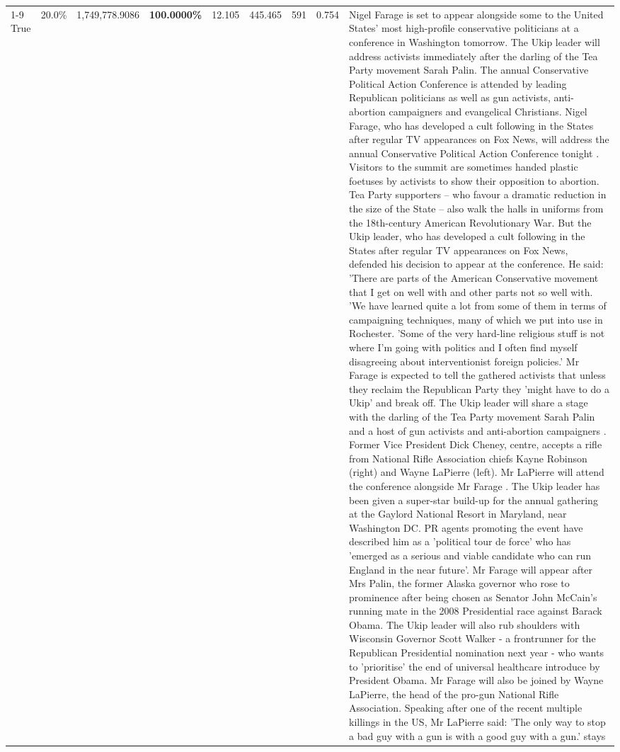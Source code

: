 \begin{table}[H]
\begin{tabular}{lllrlllll}
\cline{1-9}
True & 20.0\% & 1,749,778.9086 & \bfseries \color{red} 100.0000\% & 12.105 & 445.465 & 591 & 0.754 & Nigel Farage is set to appear alongside some to the United States' most high-profile conservative politicians at a conference in Washington tomorrow. The Ukip leader will address activists immediately after the darling of the Tea Party movement Sarah Palin. The annual Conservative Political Action Conference is attended by leading Republican politicians as well as gun activists, anti-abortion campaigners and evangelical Christians. Nigel Farage, who has developed a cult following in the States after regular TV appearances on Fox News, will address the annual Conservative Political Action Conference tonight . Visitors to the summit are sometimes handed plastic foetuses by activists to show their opposition to abortion. Tea Party supporters – who favour a dramatic reduction in the size of the State – also walk the halls in uniforms from the 18th-century American Revolutionary War. But the Ukip leader, who has developed a cult following in the States after regular TV appearances on Fox News, defended his decision to appear at the conference. He said: 'There are parts of the American Conservative movement that I get on well with and other parts not so well with. 'We have learned quite a lot from some of them in terms of campaigning techniques, many of which we put into use in Rochester. 'Some of the very hard-line religious stuff is not where I'm going with politics and I often find myself disagreeing about interventionist foreign policies.' Mr Farage is expected to tell the gathered activists that unless they reclaim the Republican Party they 'might have to do a Ukip' and break off. The Ukip leader will share a stage with the darling of the Tea Party movement Sarah Palin and a host of gun activists and anti-abortion campaigners . Former Vice President Dick Cheney, centre, accepts a rifle from National Rifle Association chiefs Kayne Robinson (right) and Wayne LaPierre (left). Mr LaPierre will attend the conference alongside Mr Farage . The Ukip leader has been given a super-star build-up for the annual gathering at the Gaylord National Resort in Maryland, near Washington DC. PR agents promoting the event have described him as a 'political tour de force' who has 'emerged as a serious and viable candidate who can run England in the near future'. Mr Farage will appear after Mrs Palin, the former Alaska governor who rose to prominence after being chosen as Senator John McCain's running mate in the 2008 Presidential race against Barack Obama. The Ukip leader will also rub shoulders with Wisconsin Governor Scott Walker - a frontrunner for the Republican Presidential nomination next year - who wants to 'prioritise' the end of universal healthcare introduce by President Obama. Mr Farage will also be joined by Wayne LaPierre, the head of the pro-gun National Rifle Association. Speaking after one of the recent multiple killings in the US, Mr LaPierre said: 'The only way to stop a bad guy with a gun is with a good guy with a gun.' stays \\

\end{tabular}
\end{table}
